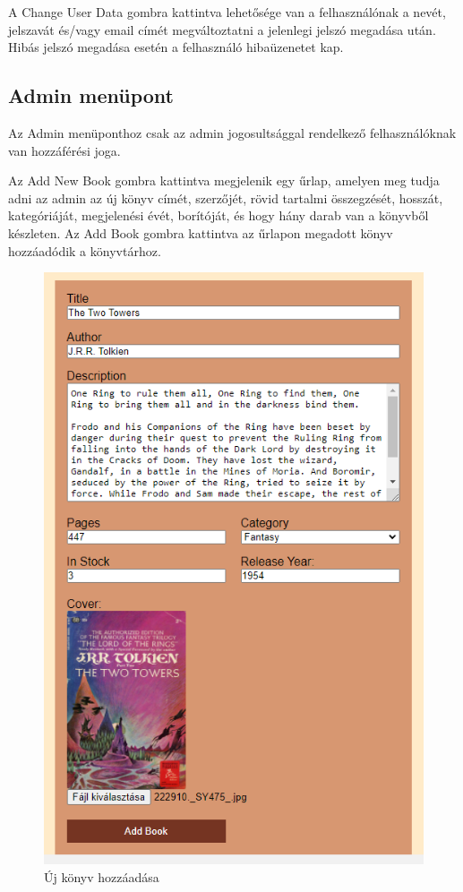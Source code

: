 \bigskip

A Change User Data gombra kattintva lehetősége van a felhasználónak a nevét, jelszavát és/vagy email címét megváltoztatni a jelenlegi jelszó megadása után. Hibás jelszó megadása esetén a felhasználó hibaüzenetet kap.

\subsection{Admin menüpont}
Az Admin menüponthoz csak az admin jogosultsággal rendelkező felhasználóknak van hozzáférési joga. 

\bigskip

Az Add New Book gombra kattintva megjelenik egy űrlap, amelyen meg tudja adni az admin az új könyv címét, szerzőjét, rövid tartalmi összegzését, hosszát, kategóriáját, megjelenési évét, borítóját, és hogy hány darab van a könyvből készleten. Az Add Book gombra kattintva az űrlapon megadott könyv hozzáadódik a könyvtárhoz. 

\begin{figure}[H]
    \centering
    \includegraphics[scale=0.7]{images/application/newbook.png}
    \caption{Új könyv hozzáadása}
\end{figure}

